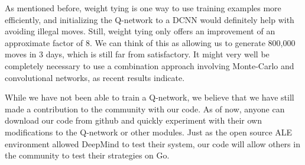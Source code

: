 As mentioned before, weight tying is one way to use training examples more efficiently, and initializing the Q-network to a DCNN would definitely help with avoiding illegal moves. Still, weight tying only offers an improvement of an approximate factor of 8. We can think of this as allowing us to generate 800,000 moves in 3 days, which is still far from satisfactory. It might very well be completely necessary to use a combination approach involving Monte-Carlo and convolutional networks, as recent results indicate. 

While we have not been able to train a Q-network, we believe that we have still made a contribution to the community with our code. As of now, anyone can download our code from github and quickly experiment with their own modifications to the Q-network or other modules. Just as the open source ALE environment allowed DeepMind to test their system, our code will allow others in the community to test their strategies on Go.
